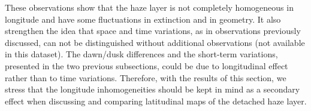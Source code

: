 These observations show that the haze layer is not completely homogeneous in longitude and have some
fluctuations in extinction and in geometry.
It also strengthen the idea that space and time variations, as in observations previously discussed,
can not be distinguished without additional observations (not available in this dataset).
The dawn/dusk differences and the short-term variations,
presented in the two previous subsections, could be due to longitudinal effect rather than to time variations.
Therefore, with the results of this section, we stress that the longitude inhomogeneities should be kept
in mind as a secondary effect when discussing and comparing latitudinal maps of the detached haze layer.
